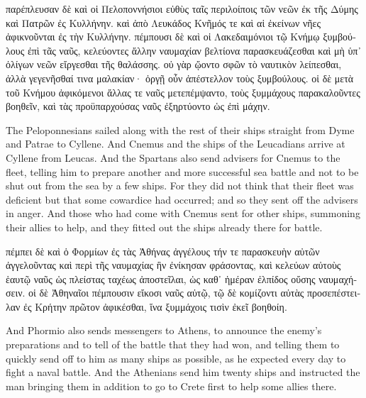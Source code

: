 \documentclass{article}
\begin{document}
\begin{greek}
παρέπλευσαν δὲ καὶ οἱ Πελοποννήσιοι εὐθὺς ταῖς περιλοίποις τῶν νεῶν ἐκ τῆς Δύμης καὶ Πατρῶν ἐς Κυλλήνην.
καὶ ἀπὸ Λευκάδος Κνῆμός τε καὶ αἱ ἐκείνων νῆες ἀφικνοῦνται ἐς τὴν Κυλλήνην.
πέμπουσι δὲ καὶ οἱ Λακεδαιμόνιοι τῷ Κνήμῳ ξυμβούλους ἐπὶ τᾶς ναῦς,
κελεύοντες ἄλλην ναυμαχίαν βελτίονα παρασκευάζεσθαι καὶ μὴ ὑπ᾿ ὀλίγων νεῶν εἴργεσθαι τῆς θαλάσσης.
οὐ γὰρ ᾤοντο σφῶν τὸ ναυτικὸν λείπεσθαι, ἀλλὰ γεγενῆσθαί τινα μαλακίαν·
ὀργῇ οὖν ἀπέστελλον τοὺς ξυμβούλους. οἱ δὲ μετὰ τοῦ Κνήμου ἀφικόμενοι ἄλλας τε ναῦς μετεπέμψαντο,
τοὺς ξυμμάχους παρακαλοῦντες βοηθεῖν, καὶ τὰς προϋπαρχούσας ναῦς ἐξηρτύοντο ὡς ἐπὶ μάχην. \\
\end{greek}


The Peloponnesians sailed along with the rest of their ships straight from Dyme and Patrae to Cyllene.
And Cnemus and the ships of the Leucadians arrive at Cyllene from Leucas.
And the Spartans also send advisers for Cnemus to the fleet,
telling him to prepare another and more successful sea battle and not to be shut out from the sea by a few ships.
For they did not think that their fleet was deficient but that some cowardice had occurred;
and so they sent off the advisers in anger.
And those who had come with Cnemus sent for other ships, summoning their allies to help,
and they fitted out the ships already there for battle. \\


\begin{greek}
πέμπει δὲ καὶ ὁ Φορμίων ἐς τὰς Ἀθήνας ἀγγέλους τήν τε παρασκευὴν αὐτῶν ἀγγελοῦντας
καὶ περὶ τῆς ναυμαχίας ἣν ἐνίκησαν φράσοντας,
καὶ κελεύων αὐτοὺς ἑαυτῷ ναῦς ὡς πλείστας ταχέως ἀποστεῖλαι,
ὡς καθ᾿ ἡμέραν ἐλπίδος οὔσης ναυμαχήσειν.
οἱ δὲ Ἀθηναῖοι πέμπουσιν εἴκοσι ναῦς αὐτῷ,
τῷ δὲ κομίζοντι αὐτὰς προσεπέστειλαν ἐς Κρήτην πρῶτον ἀφικέσθαι,
ἵνα ξυμμάχοις τισὶν ἐκεῖ βοηθοίη. \\
\end{greek}


And Phormio also sends messengers to Athens, to announce the enemy's preparations
and to tell of the battle that they had won,
and telling them to quickly send off to him as many ships as possible,
as he expected every day to fight a naval battle.
And the Athenians send him twenty ships and instructed the man bringing them in addition
to go to Crete first to help some allies there.
\end{document}
